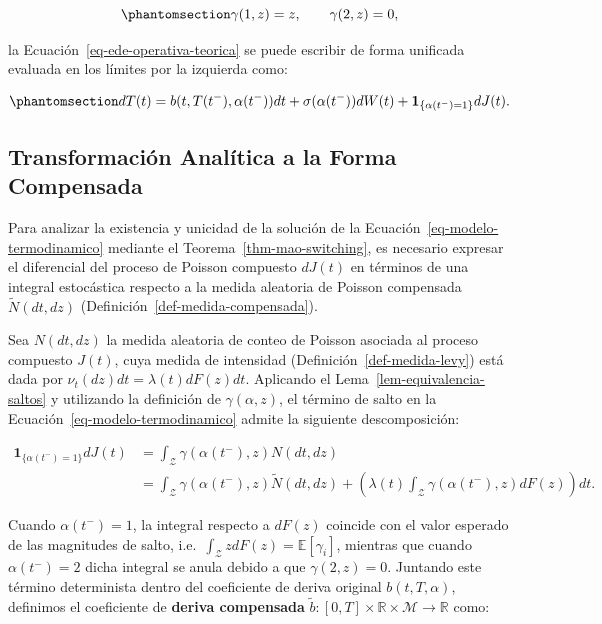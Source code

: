 \documentclass[
  spanish,
  us-letterpaper,
]{scrreprt}
\numberwithin{equation}{section}
\theoremstyle{plain}
\theoremstyle{plain}
\theoremstyle{plain}
\theoremstyle{definition}
\theoremstyle{remark}
\begin{document}
\begin{equation}\phantomsection\label{eq-funcion-salto}{
\gamma(1, z) = z, \qquad \gamma(2, z) = 0,
}\end{equation}

la Ecuación~\ref{eq-ede-operativa-teorica} se puede escribir de forma
unificada evaluada en los límites por la izquierda como:

\begin{equation}\phantomsection\label{eq-modelo-termodinamico}{
dT(t) = b(t, T(t^-), \alpha(t^-)) dt + \sigma(\alpha(t^-)) dW(t) + \mathbf{1}_{\{\alpha(t^-) = 1\}} dJ(t).
}\end{equation}

\subsection{Transformación Analítica a la Forma
Compensada}\label{transformaciuxf3n-analuxedtica-a-la-forma-compensada}

Para analizar la existencia y unicidad de la solución de la
Ecuación~\ref{eq-modelo-termodinamico} mediante el
Teorema~\ref{thm-mao-switching}, es necesario expresar el diferencial
del proceso de Poisson compuesto \(dJ(t)\) en términos de una integral
estocástica respecto a la medida aleatoria de Poisson compensada
\(\tilde{N}(dt, dz)\) (Definición~\ref{def-medida-compensada}).

Sea \(N(dt, dz)\) la medida aleatoria de conteo de Poisson asociada al
proceso compuesto \(J(t)\), cuya medida de intensidad
(Definición~\ref{def-medida-levy}) está dada por
\(\nu_t(dz)dt = \lambda(t)dF(z)dt\). Aplicando el
Lema~\ref{lem-equivalencia-saltos} y utilizando la definición de
\(\gamma(\alpha, z)\), el término de salto en la
Ecuación~\ref{eq-modelo-termodinamico} admite la siguiente
descomposición:

\[
\begin{aligned}
\mathbf{1}_{\{\alpha(t^-) = 1\}} dJ(t) &= \int_{\mathcal{Z}} \gamma(\alpha(t^-), z) N(dt, dz) \\
&= \int_{\mathcal{Z}} \gamma(\alpha(t^-), z) \tilde{N}(dt, dz) + \left( \lambda(t) \int_{\mathcal{Z}} \gamma(\alpha(t^-), z) dF(z) \right) dt.
\end{aligned}
\]

Cuando \(\alpha(t^-) = 1\), la integral respecto a \(dF(z)\) coincide
con el valor esperado de las magnitudes de salto,
i.e.~\(\displaystyle \int_{\mathcal{Z}} z dF(z) = \mathbb{E}[\gamma_i]\),
mientras que cuando \(\alpha(t^-) = 2\) dicha integral se anula debido a
que \(\gamma(2, z) = 0\). Juntando este término determinista dentro del
coeficiente de deriva original \(b(t, T, \alpha)\), definimos el
coeficiente de \textbf{deriva compensada}
\(\tilde{b}: [0, T] \times \mathbb{R} \times \mathcal{M} \to \mathbb{R}\)
como:
\end{document}
